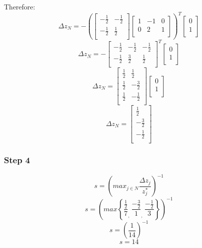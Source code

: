 \documentclass[14pt]{extarticle}
\begin{document}
\bigskip Therefore:
\[
    \Delta z_N = -\left(\begin{bmatrix}
        -\frac{1}{2} & -\frac{1}{2} \\
        -\frac{1}{2} & \frac{1}{2} \\
    \end{bmatrix}
    \begin{bmatrix}
        1 & -1 & 0 \\
        0 & 2 & 1 \\
    \end{bmatrix}\right)^T
    \begin{bmatrix}
        0 \\
        1 \\
    \end{bmatrix}
\]
\[
    \Delta z_N = -\begin{bmatrix}
        -\frac{1}{2} & -\frac{1}{2} & -\frac{1}{2} \\
        -\frac{1}{2} & \frac{3}{2} & \frac{1}{2} \\
    \end{bmatrix}^T
    \begin{bmatrix}
        0 \\
        1 \\
    \end{bmatrix}
\]
\[
    \Delta z_N = \begin{bmatrix}
        \frac{1}{2} & \frac{1}{2} \\
        \frac{1}{2} & -\frac{3}{2} \\
        \frac{1}{2} & -\frac{1}{2} \\
    \end{bmatrix}
    \begin{bmatrix}
        0 \\
        1 \\
    \end{bmatrix}
\]
\[
    \Delta z_N = \begin{bmatrix}
        \frac{1}{2} \\
        -\frac{3}{2} \\
        -\frac{1}{2} \\
    \end{bmatrix}
\]

\subsubsection*{Step 4}
\[
    s = \left(max_{j \in N} \frac{\Delta z_j}{z^*_j}\right)^{-1}
\]
\[
    s = \left(max \left\{ \frac{\frac{1}{2}}{7}_{\textstyle,}\ \frac{-\frac{3}{2}}{1}_{\textstyle,}\ \frac{-\frac{1}{2}}{3} \right\} \right)^{-1}
\]
\[
    s = \left(\frac{1}{14}\right)^{-1}
\]
\[
    s = 14
\]
\end{document}
